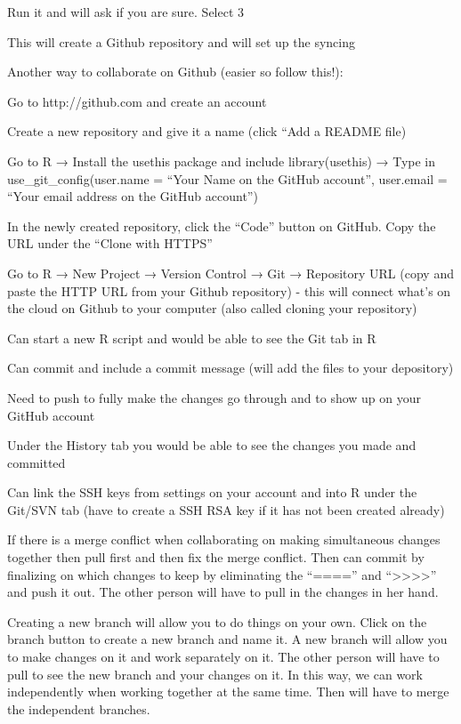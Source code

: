 \documentclass[
  letterpaper,
  DIV=11,
  numbers=noendperiod]{scrreport}
\begin{document}
Run it and will ask if you are sure. Select 3

This will create a Github repository and will set up the syncing

Another way to collaborate on Github (easier so follow this!):

Go to http://github.com and create an account

Create a new repository and give it a name (click ``Add a README file)

Go to R → Install the usethis package and include library(usethis) →
Type in use\_git\_config(user.name = ``Your Name on the GitHub
account'', user.email = ``Your email address on the GitHub account'')

In the newly created repository, click the ``Code'' button on GitHub.
Copy the URL under the ``Clone with HTTPS''

Go to R → New Project → Version Control → Git → Repository URL (copy and
paste the HTTP URL from your Github repository) - this will connect
what's on the cloud on Github to your computer (also called cloning your
repository)

Can start a new R script and would be able to see the Git tab in R

Can commit and include a commit message (will add the files to your
depository)

Need to push to fully make the changes go through and to show up on your
GitHub account

Under the History tab you would be able to see the changes you made and
committed

Can link the SSH keys from settings on your account and into R under the
Git/SVN tab (have to create a SSH RSA key if it has not been created
already)

If there is a merge conflict when collaborating on making simultaneous
changes together then pull first and then fix the merge conflict. Then
can commit by finalizing on which changes to keep by eliminating the
``===='' and ``\textgreater\textgreater\textgreater\textgreater{}'' and
push it out. The other person will have to pull in the changes in her
hand.

Creating a new branch will allow you to do things on your own. Click on
the branch button to create a new branch and name it. A new branch will
allow you to make changes on it and work separately on it. The other
person will have to pull to see the new branch and your changes on it.
In this way, we can work independently when working together at the same
time. Then will have to merge the independent branches.
\end{document}
